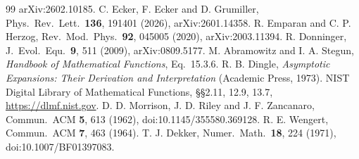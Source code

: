 \documentclass[aps,prd,onecolumn,superscriptaddress,nofootinbib,10pt]{revtex4-2}
\begin{document}
\begin{thebibliography}{99}
arXiv:2602.10185.
 C. Ecker, F. Ecker and D. Grumiller, Phys.\ Rev.\ Lett.\ \textbf{136}, 191401 (2026),
arXiv:2601.14358.
 R. Emparan and C. P. Herzog, Rev.\ Mod.\ Phys.\ \textbf{92}, 045005 (2020), arXiv:2003.11394.
 R. Donninger, J.\ Evol.\ Equ.\ \textbf{9}, 511 (2009), arXiv:0809.5177.
 M. Abramowitz and I. A. Stegun, \emph{Handbook of Mathematical Functions}, Eq.~15.3.6.
 R. B. Dingle, \emph{Asymptotic Expansions: Their Derivation and Interpretation} (Academic Press,
1973).
 NIST Digital Library of Mathematical Functions, \S\S2.11, 12.9, 13.7, \url{https://dlmf.nist.gov}.
 D. D. Morrison, J. D. Riley and J. F. Zancanaro, Commun.\ ACM \textbf{5}, 613
(1962), doi:10.1145/355580.369128.
 R. E. Wengert, Commun.\ ACM \textbf{7}, 463 (1964).
 T. J. Dekker, Numer.\ Math.\ \textbf{18}, 224 (1971), doi:10.1007/BF01397083.
\end{thebibliography}
\end{document}
